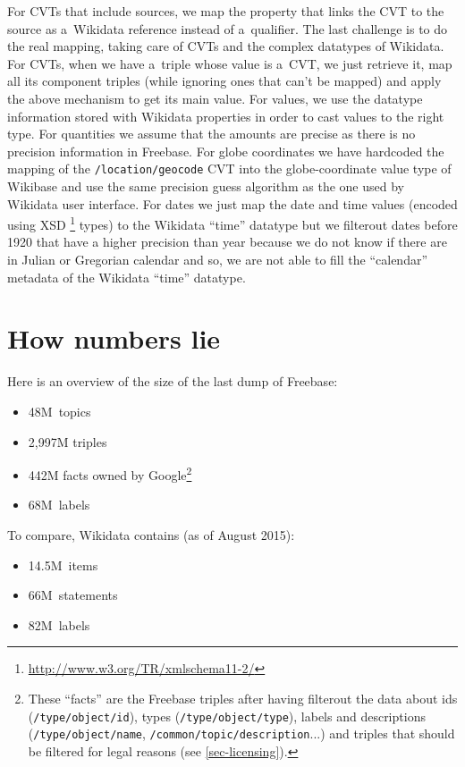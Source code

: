 \documentclass{sig-alternate}
\begin{document}
For CVTs that include sources, we map the property that links the CVT
to the source as a~Wikidata reference instead of a~qualifier.
The last challenge is to do the real mapping, taking care of CVTs
and the complex datatypes of Wikidata.
For CVTs, when we have a~triple whose value is a~CVT, we just retrieve it,
map all its component triples (while ignoring ones that can't be mapped)
and apply the above mechanism to get its main value.
For values, we use the datatype information stored with Wikidata properties
in order to cast values to the right type.
For quantities we assume that the amounts are precise
as there is no precision information in Freebase.
For globe coordinates we have hardcoded the mapping of the \texttt{/location/geocode} CVT
into the globe-coordinate value type of Wikibase
and use the same precision guess algorithm as the one used by Wikidata user interface.
For dates we just map the date and time values (encoded using XSD%
\footnote{\url{ http://www.w3.org/TR/xmlschema11-2/}} types)
to the Wikidata ``time'' datatype but we filterout dates before 1920 that have
a higher precision than year because we do not know
if there are in Julian or Gregorian calendar and so,
we are not able to fill the ``calendar'' metadata of the Wikidata ``time'' datatype.

\section{How numbers lie}

Here is an overview of the size of the last dump of Freebase:

\begin{itemize}
  \setlength\itemsep{0em}
  \item 48M~topics
  \item 2,997M triples
  \item 442M facts owned by Google\footnote{These ``facts'' are the Freebase triples
      after having filterout the data about ids (\texttt{/type/object/id}),
      types (\texttt{/type/object/type}), labels and descriptions (\texttt{/type/object/name},
      \texttt{/common/topic/description}...) and triples that should be filtered
      for legal reasons (see \autoref{sec-licensing}).}
  \item 68M~labels
\end{itemize}

To compare, Wikidata contains (as of August 2015):

\begin{itemize}
    \setlength\itemsep{0em}
    \item 14.5M~items
    \item 66M~statements
    \item 82M~labels
\end{itemize}
\end{document}
